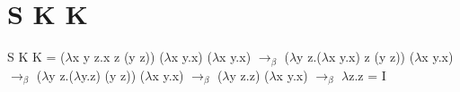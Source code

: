 \documentclass[16pt,a4paper]{scrartcl}
\begin{document}
\section{S K K}

S K K = ($\lambda$x y z.x z (y z)) ($\lambda$x y.x) ($\lambda$x y.x)
$\rightarrow_\beta$ ($\lambda$y z.($\lambda$x y.x) z (y z)) ($\lambda$x y.x)
$\rightarrow_\beta$ ($\lambda$y z.($\lambda$y.z) (y z)) ($\lambda$x y.x)
$\rightarrow_\beta$ ($\lambda$y z.z) ($\lambda$x y.x)
$\rightarrow_\beta$ $\lambda$z.z = I
\end{document}
